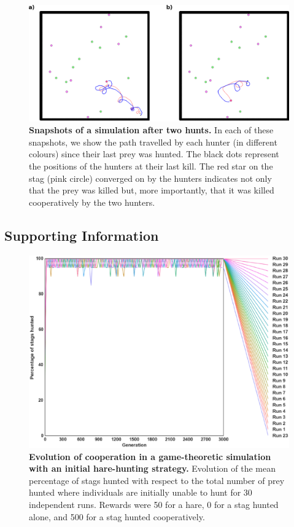     \begin{figure}[hbtp]
      \centering
        \includegraphics[scale = 1]{fig/ArticleBio1/Fig8.eps}
      \caption{\textbf{Snapshots of a simulation after two hunts.}
      In each of these snapshots, we show the path travelled by each hunter (in different colours) since their last prey was hunted. The black dots represent the positions of the hunters at their last kill. The red star on the stag (pink circle) converged on by the hunters indicates not only that the prey was killed but, more importantly, that it was killed cooperatively by the two hunters.}
      \label{fig:behaviourTraces}
    \end{figure}


  \subsection{Supporting Information}
    \begin{figure}[hbtp]
      \centering
        \includegraphics[scale = 1]{fig/ArticleBio1/S1_Fig.eps}
      \caption{\textbf{Evolution of cooperation in a game-theoretic simulation with an initial hare-hunting strategy.} 
      Evolution of the mean percentage of stags hunted with respect to the total number of prey hunted where individuals are initially unable to hunt for 30 independent runs. Rewards were 50 for a hare, 0 for a stag hunted alone, and 500 for a stag hunted cooperatively.}
      \label{S1_Fig}
    \end{figure}

